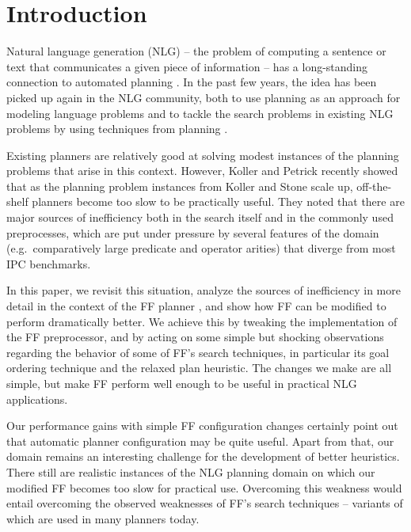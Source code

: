 
\section{Introduction} \label{sec:introduction}

Natural language generation (NLG) -- the problem of computing a
sentence or text that communicates a given piece of information -- has
a long-standing connection to automated planning
\cite{perrault80,appelt:planning}. In the past few years, the idea has
been picked up again in the NLG community, both to use planning as an
approach for modeling language problems
\cite{Steedman-Petrick:07,benotti08b} and to tackle the search
problems in existing NLG problems by using techniques from planning
\cite{KolSto07}.

Existing planners are relatively good at solving modest instances of
the planning problems that arise in this context. However, Koller and
Petrick 
recently showed that as the planning problem instances from Koller and
Stone  scale up, off-the-shelf planners become too
slow to be practically useful. They noted that there are major sources
of inefficiency both in the search itself and in the commonly used
preprocesses, which are put under pressure by several features of the
domain (e.g.\ comparatively large predicate and operator arities) that
diverge from most IPC benchmarks.

In this paper, we revisit this situation, analyze the sources of
inefficiency in more detail in the context of the FF planner
\cite{HoffmannNebel01}, and show how FF can be modified to perform
dramatically better. We achieve this by tweaking the implementation of
the FF preprocessor, and by acting on some simple but shocking
observations regarding the behavior of some of FF's search techniques,
in particular its goal ordering technique and the relaxed plan
heuristic. The changes we make are all simple, but make FF perform
well enough to be useful in practical NLG applications.



Our performance gains with simple FF configuration changes certainly
point out that automatic planner configuration may be quite
useful. Apart from that, our domain remains an interesting challenge
for the development of better heuristics. There still are realistic
instances of the NLG planning domain on which our modified FF becomes
too slow for practical use. Overcoming this weakness would entail
overcoming the observed weaknesses of FF's search techniques --
variants of which are used in many planners today.


